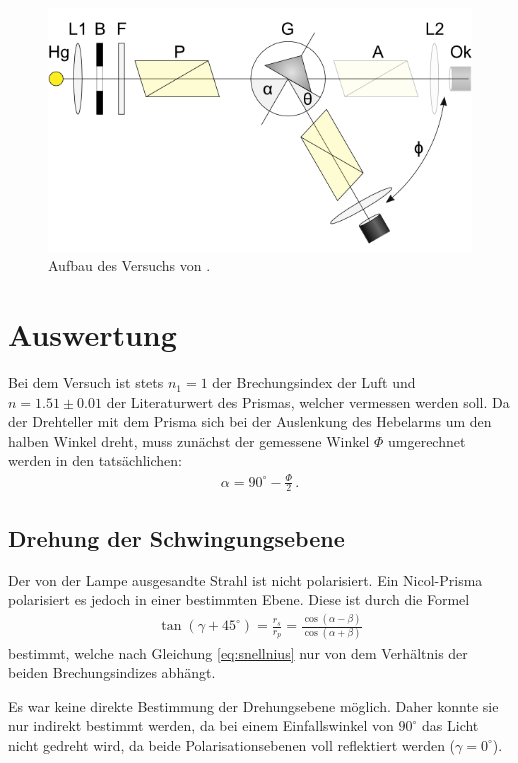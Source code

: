 \documentclass[12pt,a4paper,titlepage,headinclude,bibtotoc]{scrartcl}
\begin{document}
\begin{figure}[h]
	\centering
	\includegraphics{aufbau}
	\caption{Aufbau des Versuchs von \cite[25.3.2015, 15 Uhr]{lp20}.}
	\label{fig:schiene}
\end{figure}

\section{Auswertung}
\label{sec:auswertung}
Bei dem Versuch ist stets $n_1 =1$ der Brechungsindex der Luft und $n=1.51\pm 0.01$ der Literaturwert des Prismas, welcher vermessen werden soll.
Da der Drehteller mit dem Prisma sich bei der Auslenkung des Hebelarms um den halben Winkel dreht, muss zunächst der gemessene Winkel $\Phi$ umgerechnet werden in den tatsächlichen:
\begin{align*}
	\alpha = 90^\circ - \frac{\Phi}{2}\, .
\end{align*}

\subsection{Drehung der Schwingungsebene}
Der von der Lampe ausgesandte Strahl ist nicht polarisiert.
Ein Nicol-Prisma polarisiert es jedoch in einer bestimmten Ebene.
Diese ist durch die Formel 
\begin{align}
	\tan (\gamma +45^\circ)=\frac{r_s}{r_p}=\frac{\cos(\alpha-\beta)}{\cos (\alpha +\beta)}\label{eq:drehung}
\end{align}
bestimmt, welche nach Gleichung \eqref{eq:snellnius} nur von dem Verhältnis der beiden Brechungsindizes abhängt.

Es war keine direkte Bestimmung der Drehungsebene möglich.
Daher konnte sie nur indirekt bestimmt werden, da bei einem Einfallswinkel von $90^\circ$ das Licht nicht gedreht wird, da beide Polarisationsebenen voll reflektiert werden ($\gamma=0^\circ$).
\end{document}
